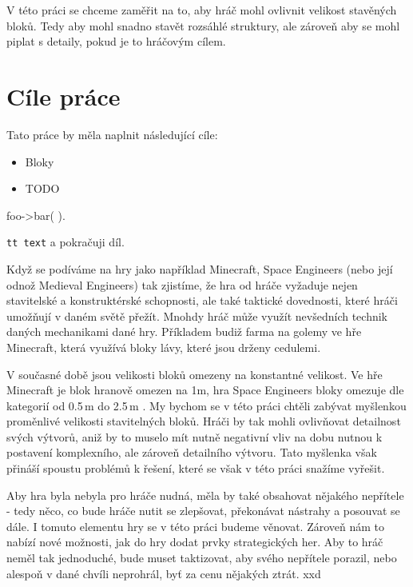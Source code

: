 V této práci se chceme zaměřit na to, aby hráč mohl ovlivnit velikost stavěných bloků. Tedy aby mohl snadno stavět rozsáhlé struktury, ale zároveň aby se mohl piplat s detaily, pokud je to hráčovým cílem.

\section{Cíle práce}
Tato práce by měla naplnit následující cíle:
\begin{itemize}
	\item Bloky
	\item TODO
\end{itemize}

\iffalse

\begin{code}
  foo->bar( ).
\end{code}

{\tt tt text} a pokračuji díl.


Když se podíváme na hry jako například Minecraft, Space Engineers (nebo její odnož Medieval Engineers) tak zjistíme, že hra od hráče vyžaduje nejen stavitelské a konstruktérské schopnosti, ale také taktické dovednosti, které hráči umožňují v daném světě přežít. Mnohdy hráč může využít nevšedních technik daných mechanikami dané hry. Příkladem budiž farma na golemy ve hře Minecraft, která využívá bloky lávy, které jsou drženy cedulemi\citep{minecraft_tut_farm}.

V současné době jsou velikosti bloků omezeny na konstantné velikost. Ve hře Minecraft je blok hranově omezen na 1m, hra Space Engineers bloky omezuje dle kategorií od 0.5\,\rm m do 2.5\,\rm m \citep{se_blocks_wiki}.
My bychom se v této práci chtěli zabývat myšlenkou proměnlivé velikosti stavitelných bloků. Hráči by tak mohli ovlivňovat detailnost svých výtvorů, aniž by to muselo mít nutně negativní vliv na dobu nutnou k postavení komplexního, ale zároveň detailního výtvoru. Tato myšlenka však přináší spoustu problémů k řešení, které se však v této práci snažíme vyřešit.

Aby hra byla nebyla pro hráče nudná, měla by také obsahovat nějakého nepřítele - tedy něco, co bude hráče nutit se zlepšovat, překonávat nástrahy a posouvat se dále. I tomuto elementu hry se v této práci budeme věnovat. Zároveň nám to nabízí nové možnosti, jak do hry dodat prvky strategických her. Aby to hráč neměl tak jednoduché, bude muset taktizovat, aby svého nepřítele porazil, nebo alespoň v dané chvíli neprohrál, byť za cenu nějakých ztrát. xxd

